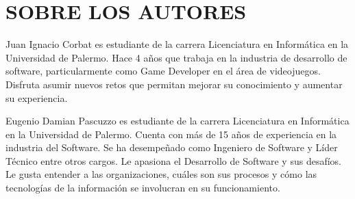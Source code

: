 \documentclass[journal]{IEEEtran}
\begin{document}
\section{SOBRE LOS AUTORES}
Juan Ignacio Corbat es estudiante de la carrera Licenciatura en Informática en la Universidad de Palermo. Hace 4 años que trabaja en la industria de desarrollo de software, particularmente como Game Developer en el área de videojuegos. Disfruta asumir nuevos retos que permitan mejorar su conocimiento y aumentar su experiencia.

Eugenio Damian Pascuzzo es estudiante de la carrera Licenciatura en Informática en la Universidad de Palermo. Cuenta con más de 15 años de experiencia en la industria del Software. Se ha desempeñado como Ingeniero de Software y Líder Técnico entre otros cargos. Le apasiona el Desarrollo de Software y sus desafíos. Le gusta entender a las organizaciones, cuáles son sus procesos y cómo las tecnologías de la información se involucran en su funcionamiento.
\end{document}
